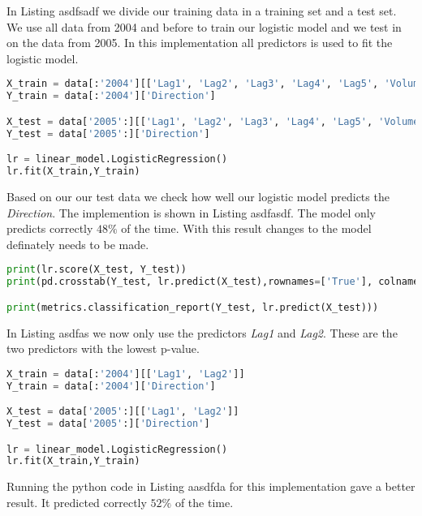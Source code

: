 \FloatBarrier

In Listing asdfsadf we divide our training data in a training set and a test set. We use all data from 2004 and before to train our logistic model and we test in on the data from 2005.  In this implementation all predictors is used to fit the logistic model.

\begin{lstlisting}[language=Python, caption=Logistic regression using all predictors]
X_train = data[:'2004'][['Lag1', 'Lag2', 'Lag3', 'Lag4', 'Lag5', 'Volume']]
Y_train = data[:'2004']['Direction']

X_test = data['2005':][['Lag1', 'Lag2', 'Lag3', 'Lag4', 'Lag5', 'Volume']]
Y_test = data['2005':]['Direction']

lr = linear_model.LogisticRegression()
lr.fit(X_train,Y_train)
\end{lstlisting}

Based on our our test data we check how well our logistic model predicts the \emph{Direction}. The implemention is shown in Listing asdfasdf. The model only predicts correctly $48\%$ of the time. With this result changes to the model definately needs to be made.
\begin{lstlisting}[language=Python, caption=Logistic regression using all predictors]
print(lr.score(X_test, Y_test))
print(pd.crosstab(Y_test, lr.predict(X_test),rownames=['True'], colnames=['Predicted'], margins=True))

print(metrics.classification_report(Y_test, lr.predict(X_test)))
\end{lstlisting}

In Listing asdfas we now only use the predictors \emph{Lag1} and \emph{Lag2}. These are the two predictors with the lowest p-value. 

\begin{lstlisting}[language=Python, caption=Logistic regression using only Lag1 and Lag2 as predictors]
X_train = data[:'2004'][['Lag1', 'Lag2']]
Y_train = data[:'2004']['Direction']

X_test = data['2005':][['Lag1', 'Lag2']]
Y_test = data['2005':]['Direction']

lr = linear_model.LogisticRegression()
lr.fit(X_train,Y_train)
\end{lstlisting}

Running the python code in Listing aasdfda for this implementation gave a better result. It predicted correctly $52\%$ of the time. 





